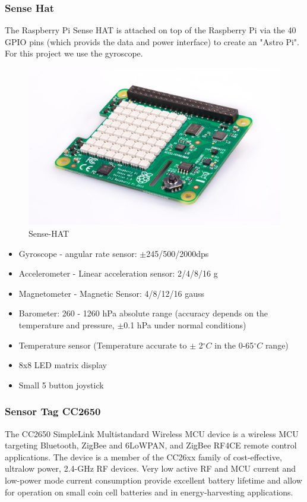\documentclass[12pt]{article}
\begin{document}
\subsubsection{Sense Hat}
The Raspberry Pi Sense HAT is attached on top of the
Raspberry Pi via the 40 GPIO pins (which provids the data
and power interface) to create an "Astro Pi". For this project we use the gyroscope.

\begin{figure}[H]
	\includegraphics[width=0.7\linewidth]{Sense-HAT}
	\centering
	\caption{Sense-HAT}
	\label{fig:sense-hat}
\end{figure}

\begin{itemize}
	\item Gyroscope - angular rate sensor: $\pm$245/500/2000dps
	\item Accelerometer - Linear acceleration sensor: 2/4/8/16 g
	\item Magnetometer - Magnetic Sensor: 4/8/12/16 gauss
	\item Barometer: 260 - 1260 hPa absolute range (accuracy depends on the temperature and
	pressure, $\pm$0.1 hPa under normal conditions)
	\item Temperature sensor (Temperature accurate to $\pm$ 2$^\circ{C}$ in the 0-65$^\circ{C}$ range)
	\item 8x8 LED matrix display
	\item Small 5 button joystick
\end{itemize}

\subsubsection{Sensor Tag CC2650}

The CC2650 SimpleLink Multistandard Wireless MCU device is a wireless MCU targeting Bluetooth, ZigBee and 6LoWPAN, and ZigBee RF4CE remote control applications.
The device is a member of the CC26xx family of cost-effective, ultralow power, 2.4-GHz RF devices. Very low active RF and MCU current and low-power mode current consumption provide excellent battery
lifetime and allow for operation on small coin cell batteries and in energy-harvesting applications.
\end{document}
